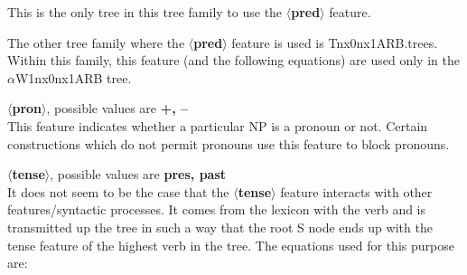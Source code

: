 This is the only tree in this tree family to use the 
{\bf $\langle$pred$\rangle$} feature.

The other tree family where the {\bf $\langle$pred$\rangle$} feature is
used is Tnx0nx1ARB.trees.  Within this family, this feature (and the
following equations) are used only in the $\alpha$W1nx0nx1ARB tree.


\noindent
{\bf $\langle$pron$\rangle$}, possible values are {\bf +, --}\\
This feature indicates whether a particular NP is a pronoun or not. 
Certain constructions which do not permit pronouns use this 
feature to block pronouns.

\noindent
{\bf $\langle$tense$\rangle$}, possible values are {\bf pres, past}\\
It does not seem to be the case that the {\bf $\langle$tense$\rangle$}
feature interacts with other features/syntactic processes. It 
comes from the lexicon with the verb and is transmitted up the
tree in such a way that the root S node ends up with the
tense feature of the highest verb in the tree. The equations
used for this purpose are:




